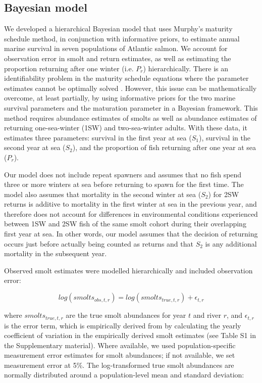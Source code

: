 \documentclass[12pt]{article}
\newcommand{\So}{$S_{1}$\xspace}
\newcommand{\St}{$S_{2}$\xspace}
\newcommand{\Pg}{$P_r$\xspace}
\newcommand{\comment}[1]{\par {\bfseries \color{blue} #1 \par}} %
\begin{document}
\subsection*{Bayesian model}

We developed a hierarchical Bayesian model that uses Murphy's maturity
schedule method, in conjunction with informative priors, to estimate annual
marine survival in seven populations of Atlantic salmon. We account for
observation error in smolt and return estimates, as well as estimating the
proportion returning after one winter (i.e. \Pg) hierarchically.
There is an identifiability problem in the maturity schedule equations where
the parameter estimates cannot be optimally solved \citep{Chaput2003a}.
However, this issue can be mathematically overcome, at least partially, by
using informative priors for the two marine survival parameters and the maturation
parameter in a Bayesian framework.
This method requires abundance estimates of smolts as well as abundance estimates
of returning one-sea-winter (1SW) and two-sea-winter adults. With these data,
it estimates three parameters: survival in the first year at sea (\So), survival
in the second year at sea (\St), and the proportion of fish returning after one
year at sea (\Pg). 

Our model does not include repeat spawners and assumes that no fish spend
three or more winters at sea before returning to spawn for the first time.
The model also assumes that mortality in the second winter at sea (\St) for 2SW returns
is additive to mortality in the first winter at sea in the previous year, 
and therefore does not account for differences in environmental conditions experienced
between 1SW and 2SW fish of the same smolt cohort during their overlapping first year at sea.
In other words, our model assumes that the decision of returning occurs just before
actually being counted as returns and that \St is any additional mortality in
the subsequent year. 


Observed smolt estimates were modelled hierarchically and included
observation error:

\begin{equation}
log(smolts_{obs,t,r}) = log(smolts_{true,t,r}) + \epsilon_{t,r}
\end{equation}

where $smolts_{true,t,r}$ are the true smolt abundances for year $t$ and river
$r$, and $\epsilon_{t,r}$ is the error term, which is empirically derived from
by calculating the yearly coefficient of variation in the empirically derived
smolt estimates (see Table S1 in the Supplementary material). 
Where available, we used population-specific measurement error estimates for smolt abundances; if not 
available, we set measurement error at 5\%. 
The log-transformed true smolt abundances are
normally distributed around a population-level mean and standard deviation:
\end{document}
